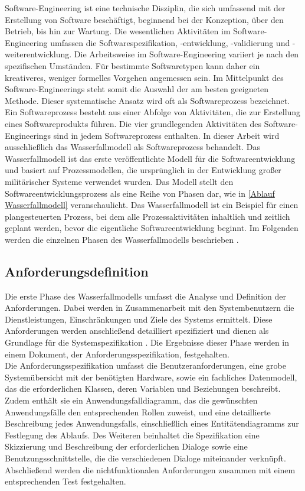 Software-Engineering ist eine technische Disziplin, die sich umfassend mit der Erstellung von Software beschäftigt, beginnend 
bei der Konzeption, über den Betrieb, bis hin zur Wartung. Die wesentlichen Aktivitäten im Software-Engineering umfassen die 
Softwarespezifikation, -entwicklung, -validierung und -weiterentwicklung. Die Arbeitsweise im Software-Engineering variiert 
je nach den spezifischen Umständen. Für bestimmte Softwaretypen kann daher ein kreativeres, weniger formelles Vorgehen angemessen 
sein. Im Mittelpunkt des Software-Engineerings steht somit die Auswahl der am besten geeigneten Methode. Dieser systematische 
Ansatz wird oft als Softwareprozess bezeichnet. Ein Softwareprozess besteht aus einer Abfolge von Aktivitäten, die zur Erstellung 
eines Softwareprodukts führen. Die vier grundlegenden Aktivitäten des Software-Engineerings sind in jedem Softwareprozess 
enthalten. In dieser Arbeit wird ausschließlich das Wasserfallmodell als Softwareprozess behandelt. Das Wasserfallmodell ist das 
erste veröffentlichte Modell für die Softwareentwicklung und basiert auf Prozessmodellen, die ursprünglich in der Entwicklung 
großer militärischer Systeme verwendet wurden. Das Modell stellt den Softwareentwicklungsprozess als eine Reihe von Phasen dar, 
wie in \autoref{Ablauf Wasserfallmodell} veranschaulicht. Das Wasserfallmodell ist ein Beispiel für einen plangesteuerten Prozess, 
bei dem alle Prozessaktivitäten inhaltlich und zeitlich geplant werden, bevor die eigentliche Softwareentwicklung beginnt. Im 
Folgenden werden die einzelnen Phasen des Wasserfallmodells beschrieben \cite{Sommerville10}.

\subsection{Anforderungsdefinition}  \label{Anforderungsdefinition}

Die erste Phase des Wasserfallmodells umfasst die Analyse und Definition der Anforderungen. Dabei werden in Zusammenarbeit mit den 
Systembenutzern die Dienstleistungen, Einschränkungen und Ziele des Systems ermittelt. Diese Anforderungen werden anschließend 
detailliert spezifiziert und dienen als Grundlage für die Systemspezifikation \cite{Sommerville10}. Die Ergebnisse dieser Phase werden in einem Dokument, 
der Anforderungsspezifikation, festgehalten.\\

Die Anforderungsspezifikation umfasst die Benutzeranforderungen, eine grobe Systemübersicht mit der benötigten Hardware, sowie ein 
fachliches Datenmodell, das die erforderlichen Klassen, deren Variablen und Beziehungen beschreibt. Zudem enthält sie ein 
Anwendungsfalldiagramm, das die gewünschten Anwendungsfälle den entsprechenden Rollen zuweist, und eine detaillierte Beschreibung 
jedes Anwendungsfalls, einschließlich eines Entitätendiagramms zur Festlegung des Ablaufs. Des Weiteren beinhaltet die Spezifikation 
eine Skizzierung und Beschreibung der erforderlichen Dialoge sowie eine Benutzungsschnittstelle, die die verschiedenen Dialoge 
miteinander verknüpft. Abschließend werden die nichtfunktionalen Anforderungen zusammen mit einem entsprechenden Test festgehalten.\\

